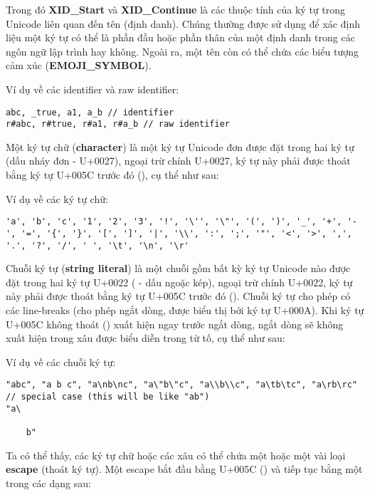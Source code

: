     \regexidentifier

\noindent Trong đó \textbf{XID\_Start} và \textbf{XID\_Continue} là các thuộc tính của ký tự trong Unicode liên quan đến tên (định danh). Chúng thường được sử dụng để xác định liệu một ký tự có thể là phần đầu hoặc phần thân của một định danh trong các ngôn ngữ lập trình hay không. Ngoài ra, một tên còn có thể chứa các biểu tượng cảm xúc (\textbf{EMOJI\_SYMBOL}).

\noindent Ví dụ về các identifier và raw identifier:
\begin{lstlisting}[]
abc, _true, a1, a_b // identifier
r#abc, r#true, r#a1, r#a_b // raw identifier
\end{lstlisting}

    Một ký tự chữ (\textbf{character}) là một ký tự Unicode đơn được đặt trong hai ký tự  (dấu nháy đơn - U+0027), ngoại trừ chính U+0027, ký tự này phải được thoát bằng ký tự U+005C trước đó (\kw{\textbackslash}), cụ thể như sau:

    \regexcharliteral

\noindent Ví dụ về các ký tự chữ:
\begin{lstlisting}[]
'a', 'b', 'c', '1', '2', '3', '!', '\'', '\"', '(', ')', '_', '+', '-', '=', '{', '}', '[', ']', '|', '\\', ':', ';', '"', '<', '>', ',', '.', '?', '/', ' ', '\t', '\n', '\r'
\end{lstlisting}

    Chuỗi ký tự (\textbf{string literal}) là một chuỗi gồm bất kỳ ký tự Unicode nào được đặt trong hai ký tự U+0022 ( - dấu ngoặc kép), ngoại trừ chính U+0022, ký tự này phải được thoát bằng ký tự U+005C trước đó (\kw{\textbackslash}). Chuỗi ký tự cho phép có các line-breaks (cho phép ngắt dòng, được biểu thị bởi ký tự U+000A). Khi ký tự U+005C không thoát (\kw{\textbackslash}) xuất hiện ngay trước ngắt dòng, ngắt dòng sẽ không xuất hiện trong xâu được biểu diễn trong từ tố, cụ thể như sau:

    \regexstringliteral

\noindent Ví dụ về các chuỗi ký tự:
\begin{lstlisting}[]
"abc", "a b c", "a\nb\nc", "a\"b\"c", "a\\b\\c", "a\tb\tc", "a\rb\rc"
// special case (this will be like "ab")
"a\

    b"
\end{lstlisting}

    Ta có thể thấy, các ký tự chữ hoặc các xâu có thể chứa một hoặc một vài loại \textbf{escape} (thoát ký tự). Một escape bắt đầu bằng U+005C (\kw{\textbackslash}) và tiếp tục bằng một trong các dạng sau:

